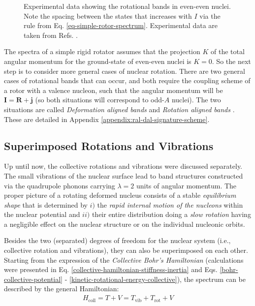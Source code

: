 \begin{figure}
    \caption{Experimental data showing the rotational bands in even-even nuclei. Note the spacing between the states that increases with $I$ via the rule from Eq. \ref{eq-simple-rotor-spectrum}. Experimental data are taken from Refs. \cite{nica2017nuclear,mccutchan2015nuclear}.}
    \label{rotational-bands-even-even}
\end{figure}

The spectra of a simple rigid rotator assumes that the projection $K$ of the total angular momentum for the ground-state of even-even nuclei is $K=0$. So the next step is to consider more general cases of nuclear rotation. There are two general cases of rotational bands that can occur, and both require the coupling scheme of a rotor with a valence nucleon, such that the angular momentum will be $\mathbf{I}=\mathbf{R}+\mathbf{j}$ (so both situations will correspond to odd-$A$ nuclei). The two situations are called \emph{Deformation aligned bands} and \emph{Rotation aligned bands} \cite{uwitonze2015assignment}. These are detailed in Appendix \ref{appendix:ral-dal-signature-scheme}.

\subsection{Superimposed Rotations and Vibrations}

Up until now, the collective rotations and vibrations were discussed separately. The small vibrations of the nuclear surface lead to band structures constructed via the quadrupole phonons carrying $\lambda=2$ units of angular momentum. The proper picture of a rotating deformed nucleus consists of a stable \emph{equilibrium shape} that is determined by $i)$ the \emph{rapid internal motion of the nucleons} within the nuclear potential and $ii)$ their entire distribution doing a \emph{slow rotation} having a negligible effect on the nuclear structure or on the individual nucleonic orbits.

Besides the two (separated) degrees of freedom for the nuclear system (i.e., collective rotation and vibrations), they can also be superimposed on each other. Starting from the expression of the \emph{Collective Bohr's Hamiltonian} (calculations were presented in Eq. \ref{collective-hamiltonian-stiffness-inertia} and Eqs. \ref{bohr-collective-potential} - \ref{kinetic-rotational-energy-collective}), the spectrum can be described by the general Hamiltonian:
\begin{align}
    H_\text{coll}=T+V=T_\text{vib}+T_\text{rot}+V
\end{align}

